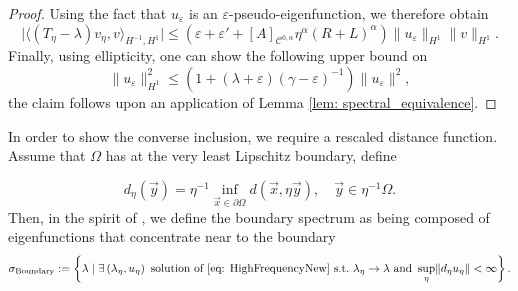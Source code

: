 \documentclass[a4paper,reqno]{amsart}
\numberwithin{equation}{section}
\numberwithin{equation}{section}		%
\numberwithin{figure}{section}			%
\numberwithin{table}{section}				%
\newcommand{\ntodo}[1]{\todo[inline, backgroundcolor=blue!20!white, bordercolor=blue]{Niklas: #1}}
\theoremstyle{definition}
\newcommand{\<}{\ensuremath \leq}
\renewcommand{\>}{\ensuremath \geq}
\renewcommand{\epsilon}{\varepsilon}
\begin{document}
\begin{proof}
    Using the fact that $u_\epsilon$ is an $\epsilon$-pseudo-eigenfunction,  we therefore obtain 
    \begin{equation}
        \lvert \langle (T_{\eta}-\lambda )v_\eta,v \rangle_{H^{-1},H^{1}}\rvert \leq \left(\varepsilon + \varepsilon' + [A]_{\mathcal{C}^{0,\alpha}}\eta^\alpha(R+L)^\alpha\right)\lVert u_\varepsilon\rVert_{H^1}\lVert v\rVert_{H^1}.
    \end{equation}
    Finally, using ellipticity, one can show the following upper bound on 
    \begin{equation}
        \lVert u_\epsilon\rVert_{H^1}^2\leq (1 + (\lambda + \epsilon)(\gamma-\epsilon)^{-1})\lVert u_\epsilon \rVert^2,
    \end{equation}
    the claim follows upon an application of Lemma \ref{lem: spectral_equivalence}.
\end{proof}
In order to show the converse inclusion, we require a rescaled distance function. Assume that $\Omega$ has at the very least Lipschitz boundary, define

\begin{equation} d_\eta(\vec{y})=\eta^{-1}\inf_{\vec{x}\in\partial\Omega}d(\vec x,\eta\vec{y}),\quad \vec{y}\in \eta^{-1}\Omega.
\end{equation}
Then, in the spirit of \cite{allaire1998bloch}, we define the boundary spectrum as being composed of eigenfunctions that concentrate near to the boundary
\begin{equation}\label{eq: BoundarySpectrumDef}
    \sigma_{\text{Boundary}}:=\left\{\lambda\mid\exists\left(\lambda_\eta,u_\eta\right) \text{ solution of \eqref{eq: HighFrequencyNew} s.t.\ }\lambda_\eta\rightarrow\lambda \text{ and } \sup_\eta \lVert d_\eta u_\eta\rVert < \infty\right\}.
\end{equation}
\end{document}
